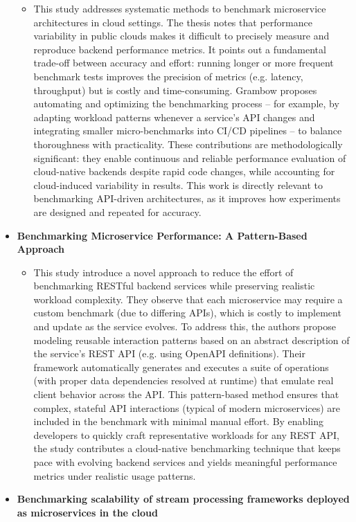 \documentclass[11pt]{article}
\begin{document}
\begin{itemize}
\begin{itemize}
        \item[] This study addresses systematic methods to benchmark microservice architectures in cloud settings. The thesis notes that performance variability in public clouds makes it difficult to precisely measure and reproduce backend performance metrics. It points out a fundamental trade-off between accuracy and effort: running longer or more frequent benchmark tests improves the precision of metrics (e.g. latency, throughput) but is costly and time-consuming. Grambow proposes automating and optimizing the benchmarking process – for example, by adapting workload patterns whenever a service’s API changes and integrating smaller micro-benchmarks into CI/CD pipelines – to balance thoroughness with practicality. These contributions are methodologically significant: they enable continuous and reliable performance evaluation of cloud-native backends despite rapid code changes, while accounting for cloud-induced variability in results. This work is directly relevant to benchmarking API-driven architectures, as it improves how experiments are designed and repeated for accuracy.
    \end{itemize}
    \newpage
    \item[] \textbf{Benchmarking Microservice Performance: A Pattern-Based Approach}
    \begin{itemize}
        \item[] This study introduce a novel approach to reduce the effort of benchmarking RESTful backend services while preserving realistic workload complexity. They observe that each microservice may require a custom benchmark (due to differing APIs), which is costly to implement and update as the service evolves. To address this, the authors propose modeling reusable interaction patterns based on an abstract description of the service’s REST API (e.g. using OpenAPI definitions). Their framework automatically generates and executes a suite of operations (with proper data dependencies resolved at runtime) that emulate real client behavior across the API. This pattern-based method ensures that complex, stateful API interactions (typical of modern microservices) are included in the benchmark with minimal manual effort. By enabling developers to quickly craft representative workloads for any REST API, the study contributes a cloud-native benchmarking technique that keeps pace with evolving backend services and yields meaningful performance metrics under realistic usage patterns.
    \end{itemize}
    \item[] \textbf{Benchmarking scalability of stream processing frameworks deployed as microservices in the cloud}

\end{itemize}
\end{document}
